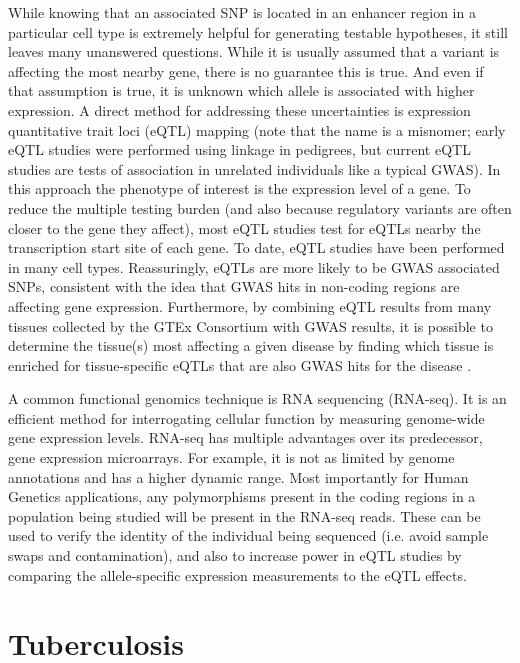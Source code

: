 While knowing that an associated SNP is located in an enhancer region
in a particular cell type is extremely helpful for generating testable
hypotheses, it still leaves many unanswered questions. While it is
usually assumed that a variant is affecting the most nearby gene,
there is no guarantee this is true. And even if that assumption is
true, it is unknown which allele is associated with higher
expression. A direct method for addressing these uncertainties is
expression quantitative trait loci (eQTL) mapping (note that the name
is a misnomer; early eQTL studies were performed using linkage in
pedigrees, but current eQTL studies are tests of association in
unrelated individuals like a typical GWAS). In this approach the
phenotype of interest is the expression level of a gene. To reduce the
multiple testing burden (and also because regulatory variants are
often closer to the gene they affect), most eQTL studies test for
eQTLs nearby the transcription start site of each gene. To date, eQTL
studies have been performed in many cell types. Reassuringly, eQTLs
are more likely to be GWAS associated SNPs, consistent with the idea
that GWAS hits in non-coding regions are affecting gene
expression. Furthermore, by combining eQTL results from many tissues
collected by the GTEx Consortium with GWAS results, it is possible to
determine the tissue(s) most affecting a given disease by finding
which tissue is enriched for tissue-specific eQTLs that are also GWAS
hits for the disease \citep{Ongen2016}.

A common functional genomics technique is RNA sequencing (RNA-seq). It
is an efficient method for interrogating cellular function by
measuring genome-wide gene expression levels. RNA-seq has multiple
advantages over its predecessor, gene expression microarrays. For
example, it is not as limited by genome annotations and has a higher
dynamic range. Most importantly for Human Genetics applications, any
polymorphisms present in the coding regions in a population being
studied will be present in the RNA-seq reads. These can be used to
verify the identity of the individual being sequenced (i.e. avoid
sample swaps and contamination), and also to increase power in eQTL
studies by comparing the allele-specific expression measurements to
the eQTL effects.

\section{Tuberculosis}

